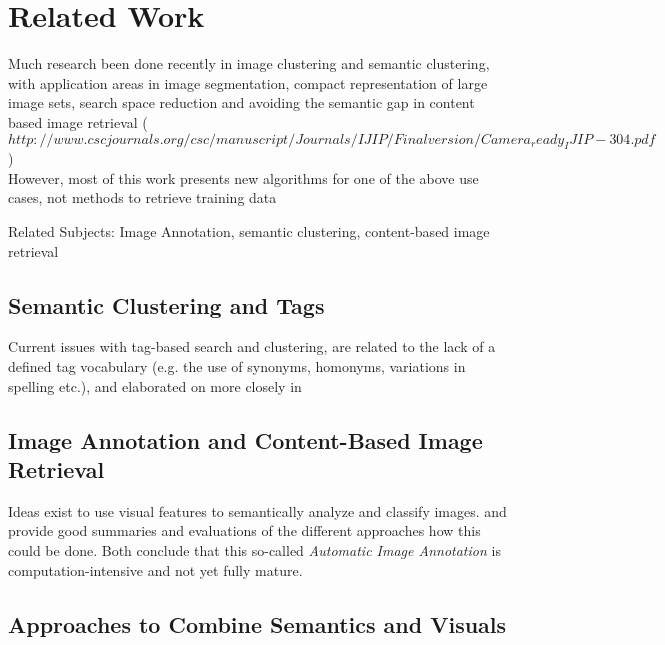 %
\section{Related Work}
\label{sec_relatedwork}

Much research been done recently in image clustering and semantic clustering, with application areas in image segmentation, compact representation of large image sets, search space reduction and avoiding the semantic gap in content based image retrieval ($http://www.cscjournals.org/csc/manuscript/Journals/IJIP/Finalversion/Camera_ready_IJIP-304.pdf$) \\
However, most of this work presents new algorithms for one of the above use cases, not methods to retrieve training data

Related Subjects: Image Annotation, semantic clustering, content-based image retrieval

\subsection{Semantic Clustering and Tags}
Current issues with tag-based search and clustering, are related to the lack of a defined tag vocabulary (e.g. the use of synonyms, homonyms, variations in spelling etc.), and elaborated on more closely in \cite{Auer2011}

\subsection{Image Annotation and Content-Based Image Retrieval}

Ideas exist to use visual features to semantically analyze and classify images. \cite{Liu2007} and \cite{Zhang2012} provide good summaries and evaluations of the different approaches how this could be done. Both conclude that this so-called \emph{Automatic Image Annotation}  is computation-intensive and not yet fully mature.

\subsection{Approaches to Combine Semantics and Visuals}
